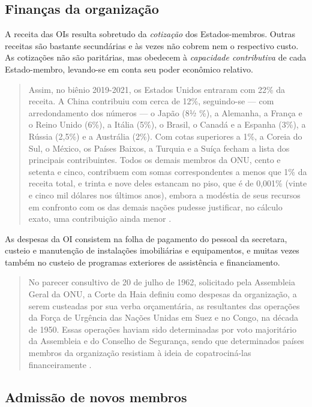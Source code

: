 \documentclass{article}
\begin{document}
\subsection{Finanças da organização}

A receita das OIs resulta sobretudo da \textit{cotização} dos Estados-membros. Outras receitas são bastante secundárias e às vezes não cobrem nem o respectivo custo. As cotizações não são paritárias, mas obedecem à \textit{capacidade contributiva} de cada Estado-membro, levando-se em conta seu poder econômico relativo.

\begin{quote}
    Assim, no biênio 2019-2021, os Estados Unidos entraram com 22\% da receita. A China contribuiu com cerca de 12\%, seguindo-se — com arredondamento dos números — o Japão (8½ \%), a Alemanha, a França e o Reino Unido (6\%), a Itália (5\%), o Brasil, o Canadá e a Espanha (3\%), a Rússia (2,5\%) e a Austrália (2\%). Com cotas superiores a 1\%, a Coreia do Sul, o México, os Países Baixos, a Turquia e a Suíça fecham a lista dos principais contribuintes. Todos os demais membros da ONU, cento e setenta e cinco, contribuem com somas correspondentes a menos que 1\% da receita total, e trinta e nove deles estancam no piso, que é de 0,001\% (vinte e cinco mil dólares nos últimos anos), embora a modéstia de seus recursos em confronto com os das demais nações pudesse justificar, no cálculo exato, uma contribuição ainda menor \cite[p. 115]{rezek_direito_2024}.
\end{quote}

As despesas da OI consistem na folha de pagamento do pessoal da secretara, custeio e manutenção de instalações imobiliárias e equipamentos, e muitas vezes também no custeio de programas exteriores de assistência e financiamento.

\begin{quote}
    No parecer consultivo de 20 de julho de 1962, solicitado pela Assembleia Geral da ONU, a Corte da Haia definiu como despesas da organização, a serem custeadas por sua verba orçamentária, as resultantes das operações da Força de Urgência das Nações Unidas em Suez e no Congo, na década de 1950. Essas operações haviam sido determinadas por voto majoritário da Assembleia e do Conselho de Segurança, sendo que determinados países membros da organização resistiam à ideia de copatrociná-las financeiramente \cite[p. 115]{rezek_direito_2024}.
\end{quote}

\subsection{Admissão de novos membros}
\end{document}

